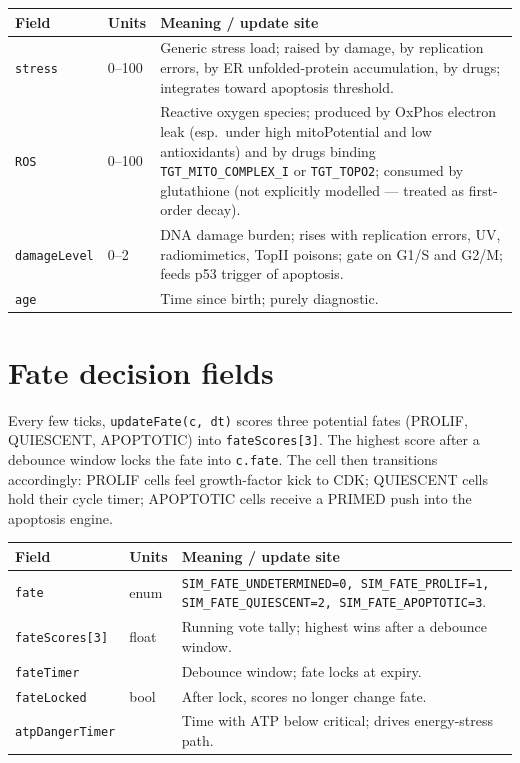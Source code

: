 \documentclass[11pt,letterpaper,twoside,openany]{book}
\newcommand{\code}[1]{\texttt{#1}}
\newcommand{\biosec}{\text{bio-s}}
\begin{document}
\begin{longtable}{p{3.3cm} p{2.2cm} p{7.5cm}}
\toprule
\textbf{Field} & \textbf{Units} & \textbf{Meaning / update site}\\ \midrule
\code{stress}        & 0--100 & Generic stress load; raised by damage, by replication errors, by ER unfolded-protein accumulation, by drugs; integrates toward apoptosis threshold.\\
\code{ROS}           & 0--100 & Reactive oxygen species; produced by OxPhos electron leak (esp.\ under high mitoPotential and low antioxidants) and by drugs binding \code{TGT\_MITO\_COMPLEX\_I} or \code{TGT\_TOPO2}; consumed by glutathione (not explicitly modelled --- treated as first-order decay).\\
\code{damageLevel}   & 0--2   & DNA damage burden; rises with replication errors, UV, radiomimetics, TopII poisons; gate on G1/S and G2/M; feeds p53 trigger of apoptosis.\\
\code{age}           & \biosec & Time since birth; purely diagnostic.\\
\bottomrule
\end{longtable}

\section{Fate decision fields}

Every few ticks, \code{updateFate(c, dt)} scores three potential fates
(PROLIF, QUIESCENT, APOPTOTIC) into \code{fateScores[3]}. The highest
score after a debounce window locks the fate into \code{c.fate}. The
cell then transitions accordingly: PROLIF cells feel growth-factor
kick to CDK; QUIESCENT cells hold their cycle timer; APOPTOTIC cells
receive a PRIMED push into the apoptosis engine.

\begin{longtable}{p{3.3cm} p{2.2cm} p{7.5cm}}
\toprule
\textbf{Field} & \textbf{Units} & \textbf{Meaning / update site}\\ \midrule
\code{fate}         & enum  & \code{SIM\_FATE\_UNDETERMINED=0, SIM\_FATE\_PROLIF=1, SIM\_FATE\_QUIESCENT=2, SIM\_FATE\_APOPTOTIC=3}.\\
\code{fateScores[3]} & float & Running vote tally; highest wins after a debounce window.\\
\code{fateTimer}    & \biosec & Debounce window; fate locks at expiry.\\
\code{fateLocked}   & bool  & After lock, scores no longer change fate.\\
\code{atpDangerTimer}& \biosec & Time with ATP below critical; drives energy-stress path.\\
\bottomrule
\end{longtable}
\end{document}
